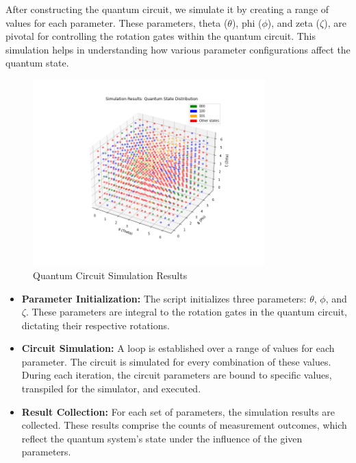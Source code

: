 \documentclass{article}
\begin{document}
\begin{multicols}{2}
After constructing the quantum circuit, we simulate it by creating a range of values for each parameter. These parameters, theta ($\theta$), phi ($\phi$), and zeta ($\zeta$), are pivotal for controlling the rotation gates within the quantum circuit. This simulation helps in understanding how various parameter configurations affect the quantum state.

\begin{figure}[H]
        \hspace*{-3.5cm}  %
        \centering
        \includegraphics[width=0.80\textwidth]{../3d_simulation_results_plot.png}
        \caption{Quantum Circuit Simulation Results}
        \label{fig:quantum_circuit_simulation}
\end{figure}

\begin{itemize}
    \item \textbf{Parameter Initialization:} The script initializes three parameters: $\theta$, $\phi$, and $\zeta$. These parameters are integral to the rotation gates in the quantum circuit, dictating their respective rotations.
    
    \item \textbf{Circuit Simulation:} A loop is established over a range of values for each parameter. The circuit is simulated for every combination of these values. During each iteration, the circuit parameters are bound to specific values, transpiled for the simulator, and executed.
    
    \item \textbf{Result Collection:} For each set of parameters, the simulation results are collected. These results comprise the counts of measurement outcomes, which reflect the quantum system's state under the influence of the given parameters.
    

\end{itemize}
\end{multicols}
\end{document}
